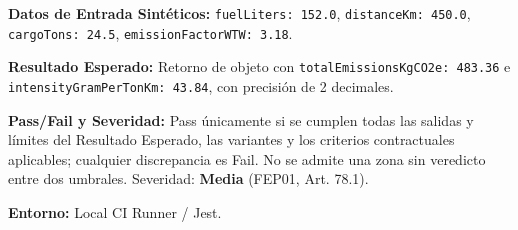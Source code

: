 \par\noindent\textbf{Datos de Entrada Sintéticos:} \texttt{f\allowbreak{}u\allowbreak{}e\allowbreak{}l\allowbreak{}L\allowbreak{}i\allowbreak{}t\allowbreak{}e\allowbreak{}r\allowbreak{}s\allowbreak{}:\allowbreak{} 1\allowbreak{}5\allowbreak{}2\allowbreak{}.\allowbreak{}0\allowbreak{}}, \texttt{d\allowbreak{}i\allowbreak{}s\allowbreak{}t\allowbreak{}a\allowbreak{}n\allowbreak{}c\allowbreak{}e\allowbreak{}K\allowbreak{}m\allowbreak{}:\allowbreak{} 4\allowbreak{}5\allowbreak{}0\allowbreak{}.\allowbreak{}0\allowbreak{}}, \texttt{c\allowbreak{}a\allowbreak{}r\allowbreak{}g\allowbreak{}o\allowbreak{}T\allowbreak{}o\allowbreak{}n\allowbreak{}s\allowbreak{}:\allowbreak{} 2\allowbreak{}4\allowbreak{}.\allowbreak{}5\allowbreak{}}, \texttt{e\allowbreak{}m\allowbreak{}i\allowbreak{}s\allowbreak{}s\allowbreak{}i\allowbreak{}o\allowbreak{}n\allowbreak{}F\allowbreak{}a\allowbreak{}c\allowbreak{}t\allowbreak{}o\allowbreak{}r\allowbreak{}W\allowbreak{}T\allowbreak{}W\allowbreak{}:\allowbreak{} 3\allowbreak{}.\allowbreak{}1\allowbreak{}8\allowbreak{}}.\par
\par\noindent\textbf{Resultado Esperado:} Retorno de objeto con \texttt{t\allowbreak{}o\allowbreak{}t\allowbreak{}a\allowbreak{}l\allowbreak{}E\allowbreak{}m\allowbreak{}i\allowbreak{}s\allowbreak{}s\allowbreak{}i\allowbreak{}o\allowbreak{}n\allowbreak{}s\allowbreak{}K\allowbreak{}g\allowbreak{}C\allowbreak{}O\allowbreak{}2\allowbreak{}e\allowbreak{}:\allowbreak{} 4\allowbreak{}8\allowbreak{}3\allowbreak{}.\allowbreak{}3\allowbreak{}6\allowbreak{}} e \texttt{i\allowbreak{}n\allowbreak{}t\allowbreak{}e\allowbreak{}n\allowbreak{}s\allowbreak{}i\allowbreak{}t\allowbreak{}y\allowbreak{}G\allowbreak{}r\allowbreak{}a\allowbreak{}m\allowbreak{}P\allowbreak{}e\allowbreak{}r\allowbreak{}T\allowbreak{}o\allowbreak{}n\allowbreak{}K\allowbreak{}m\allowbreak{}:\allowbreak{} 4\allowbreak{}3\allowbreak{}.\allowbreak{}8\allowbreak{}4\allowbreak{}}, con precisión de 2 decimales.\par
\par\noindent\textbf{Pass/Fail y Severidad:} Pass únicamente si se cumplen todas las salidas y límites del Resultado Esperado, las variantes y los criterios contractuales aplicables; cualquier discrepancia es Fail. No se admite una zona sin veredicto entre dos umbrales. Severidad: \textbf{Media} (FEP01, Art. 78.1).\par
\par\noindent\textbf{Entorno:} Local CI Runner / Jest.\par







